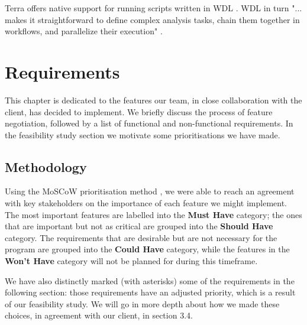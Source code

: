 \documentclass{report}
\begin{document}
Terra offers native support for running scripts written in WDL \cite{terra.bio}. WDL in turn "... makes it straightforward to define complex analysis tasks, chain them together in workflows, and parallelize their execution" \cite{wdl}.






























\chapter{Requirements}
This chapter is dedicated to the features our team, in close collaboration with the client, has decided to implement. We briefly discuss the process of feature negotiation, followed by a list of functional and non-functional requirements. In the feasibility study section we motivate some prioritisations we have made.


\section{Methodology}
Using the MoSCoW prioritisation method \cite{clegg1994moscow}, we were able to reach an agreement with key stakeholders on the importance of each feature we might implement. The most important features are labelled into the \textbf{Must Have} category; the ones that are important but not as critical are grouped into the \textbf{Should Have} category. The requirements that are desirable but are not necessary for the program are grouped into the \textbf{Could Have} category, while the features in the \textbf{Won't Have} category will not be planned for during this timeframe.

We have also distinctly marked (with asterisks) some of the requirements in the following section: those requirements have an adjusted priority, which is a result of our feasibility study. We will go in more depth about how we made these choices, in agreement with our client, in section 3.4.
\end{document}
